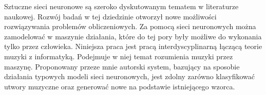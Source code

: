 \noindent Sztuczne sieci neuronowe są szeroko dyskutowanym tematem w literaturze naukowej. Rozwój badań w tej dziedzinie otworzył nowe możliwości rozwiązywania problemów obliczeniowych. Za pomocą sieci neuronowych można zamodelować w maszynie działania, które do tej pory były możliwe do wykonania tylko przez człowieka. 
Niniejsza praca jest pracą interdyscyplinarną łączącą teorie muzyki z informatyką. Podejmuje w niej temat rozumienia muzyki przez maszynę. Proponowany przeze mnie autorski system, bazujący na sposobie działania typowych modeli sieci neuronowych, jest zdolny zarówno klasyfikować utwory muzyczne oraz generować nowe na podstawie istniejącego wzorca.